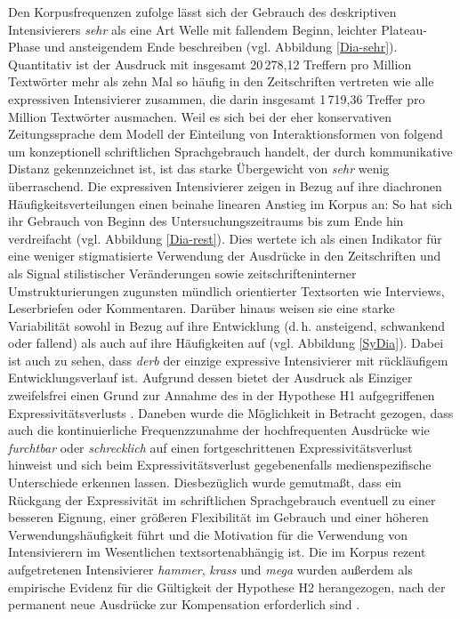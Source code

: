 Den Korpusfrequenzen zufolge lässt sich der Gebrauch des deskriptiven Intensivierers \textit{sehr} als eine Art Welle mit fallendem Beginn, leichter Plateau-Phase und ansteigendem Ende beschreiben (vgl. Abbildung \ref{Dia-sehr}). Quantitativ ist der Ausdruck mit insgesamt 20\,278,12 Treffern pro Million Textwörter mehr als zehn Mal so häufig in den Zeitschriften vertreten wie alle expressiven Intensivierer zusammen, die darin insgesamt 1\,719,36 Treffer pro Million Textwörter ausmachen. Weil es sich bei der eher konservativen Zeitungssprache dem Modell der Einteilung von Interaktionsformen von \citet[]{Koch.1996,Koch.2007} folgend um konzeptionell schriftlichen Sprachgebrauch handelt, der durch kommunikative Distanz gekennzeichnet ist, ist das starke Übergewicht von \textit{sehr} wenig überraschend. Die expressiven Intensivierer zeigen in Bezug auf ihre diachronen Häufigkeitsverteilungen einen beinahe linearen Anstieg im Korpus an: So hat sich ihr Gebrauch von Beginn des Untersuchungszeitraums bis zum Ende hin verdreifacht (vgl. Abbildung \ref{Dia-rest}). Dies wertete ich als einen Indikator für eine weniger stigmatisierte Verwendung der Ausdrücke in den Zeitschriften und als Signal stilistischer Veränderungen sowie zeitschrifteninterner Umstrukturierungen zugunsten mündlich orientierter Textsorten wie Interviews, Leserbriefen oder Kommentaren. Darüber hinaus weisen sie eine starke Variabilität sowohl in Bezug auf ihre Entwicklung (d.\,h. ansteigend, schwankend oder fallend) als auch auf ihre Häufigkeiten auf (vgl. Abbildung \ref{SyDia}). Dabei ist auch zu sehen, dass \textit{derb} der einzige expressive Intensivierer mit rückläufigem Entwicklungsverlauf ist. Aufgrund dessen bietet der Ausdruck als Einziger zweifelsfrei einen Grund zur Annahme des in der Hypothese H1 aufgegriffenen Expressivitätsverlusts \citep[vgl.][2]{Hauschild.1899}. Daneben wurde die Möglichkeit in Betracht gezogen, dass auch die kontinuierliche Frequenzzunahme der hochfrequenten Ausdrücke wie \textit{furchtbar} oder \textit{schrecklich} auf einen fortgeschrittenen Expressivitätsverlust hinweist und sich beim Expressivitätsverlust gegebenenfalls medienspezifische Unterschiede erkennen lassen. Diesbezüglich wurde gemutmaßt, dass ein Rückgang der Expressivität im schriftlichen Sprachgebrauch eventuell zu einer besseren Eignung, einer größeren Flexibilität im Gebrauch und einer höheren Verwendungshäufigkeit führt und die Motivation für die Verwendung von Intensivierern im Wesentlichen textsortenabhängig ist. Die im Korpus rezent aufgetretenen Intensivierer \textit{hammer}, \textit{krass} und \textit{mega} wurden außerdem als empirische Evidenz für die Gültigkeit der Hypothese H2 herangezogen, nach der permanent neue Ausdrücke zur Kompensation erforderlich sind \citep[vgl.][274]{Baumgarten.1908}. \par 
